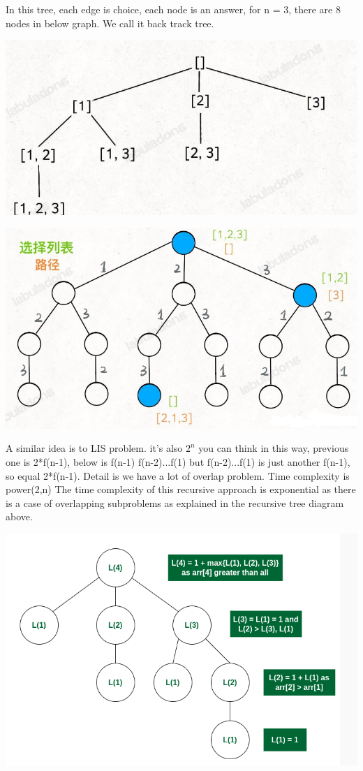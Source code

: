 \documentclass[a4paper,11pt,twoside]{book}
\begin{document}
	In this tree, each edge is choice, each node is an answer, for n = 3, there are 8 nodes in below graph. We call it back track tree. 
	
\begin{center}
	\includegraphics[width=0.7\linewidth]{pics/path1.png}
\end{center}	
	
\begin{center}
	\includegraphics[width=0.7\linewidth]{pics/path.png}
\end{center}	
		
	\par A similar idea is to LIS problem. it's also $2^n$
	you can think in this way, previous one is 2*f(n-1), below is f(n-1) f(n-2)...f(1)
	but f(n-2)...f(1) is just another f(n-1), so equal 2*f(n-1). Detail is we have a lot of overlap problem.
	Time complexity is power(2,n) The time complexity of this recursive approach is exponential as there is a case of overlapping subproblems as explained in the recursive tree diagram above.
	\begin{center}
		\includegraphics[width=0.7\linewidth]{pics/lis}
	\end{center}
	
\end{document}
